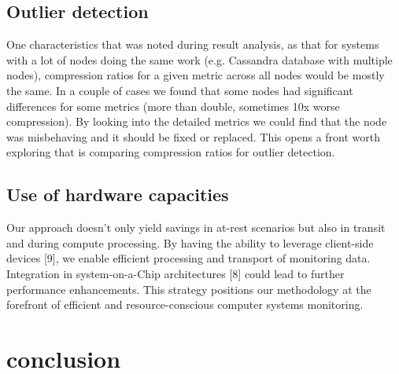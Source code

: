 \documentclass[conference]{IEEEtran}
\begin{document}
\subsection{Outlier detection}

One characteristics that was noted during result analysis, as that for systems with a lot of nodes doing the same work (e.g. Cassandra database with multiple nodes), compression ratios for a given metric across all nodes would be mostly the same.
In a couple of cases we found that some nodes had significant differences for some metrics (more than double, sometimes 10x worse compression). By looking into the detailed metrics we could find that the node was misbehaving and it should be fixed 
or replaced. This opens a front worth exploring that is comparing compression ratios for outlier detection.


\subsection{Use of hardware capacities}

Our approach doesn't only yield savings in at-rest scenarios but also in transit and during compute processing.
By having the ability to leverage client-side devices [9], we enable efficient processing and transport of monitoring data. 
Integration in system-on-a-Chip architectures [8] could lead to further performance enhancements. 
This strategy positions our methodology at the forefront of efficient and resource-conscious computer systems monitoring.

\section{conclusion}
\end{document}
